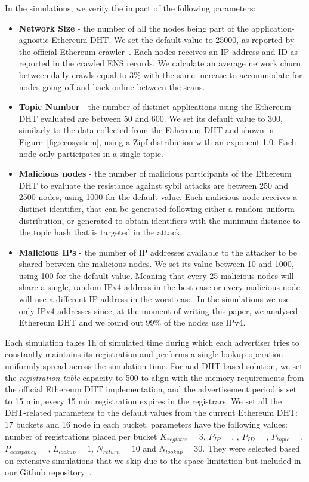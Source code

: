 In the simulations, we verify the impact of the following parameters:
 \begin{itemize}
     \item \textbf{Network Size} - the number of all the nodes being part of the application-agnostic Ethereum DHT. We set the default value to 25000, as reported by the official Ethereum crawler~\cite{discv4-dns-lists}. Each nodes receives an IP address and ID as reported in the crawled ENS records. We calculate an average network churn between daily crawls equal to 3\% with the same increase to accommodate for nodes going off and back online between the scans. 
     \item \textbf{Topic Number} - the number of distinct applications using the Ethereum DHT evaluated are between 50 and 600. We set its default value to 300, similarly to the data collected from the Ethereum DHT and shown in Figure~\ref{fig:ecosystem}, using a Zipf distribution with an exponent 1.0.  Each node only participates in a single topic.
     \item \textbf{Malicious nodes} - the number of malicious participants of the Ethereum DHT to evaluate the resistance against sybil attacks are between 250 and 2500 nodes,  using 1000 for the default value.  Each malicious node receives a distinct identifier, that can be generated following either a random uniform distribution,  or generated to obtain identifiers with the minimum distance to the topic hash that is targeted in the attack.
     \item \textbf{Malicious IPs} - the number of IP addresses available to the attacker to be shared between the malicious nodes. We set its value between 10 and 1000,  using 100 for the default value.  Meaning that every 25 malicious nodes will share a single, random IPv4 address in the best case or every malicious node will use a different IP address in the worst case.  
In the simulations we use only IPv4 addresses since, at the moment of writing this paper,  we analysed  Ethereum DHT and we found out 99\% of the nodes use IPv4.
 \end{itemize}
 
Each simulation takes 1h of simulated time during which each advertiser tries to constantly maintains its registration and performs a single lookup operation uniformly spread across the simulation time.  For \sysname and DHT-based solution, we set the \emph{registration table} capacity to 500  to align with the memory requirements from the official Ethereum DHT implementation, and the advertisement period is set to 15 min, \ie every 15 min registration expires in the registrars. 
We set all the DHT-related parameters to the default values from the current Ethereum DHT: 17 buckets and 16 node in each bucket.
 \sysname parameters have the following values: number of registrations placed per bucket $K_{register}= 3$, $P_{IP} = $, , $P_{ID} = $, $P_{topic} = $, $P_{occupancy} = $,  $L_\textit{lookup}=1$, $N_\textit{return}=10$ and $N_\textit{lookup}=30$. 
They were selected based on extensive simulations that we skip due to the space limitation but included in our Github repository~\cite{our_repo}. 

